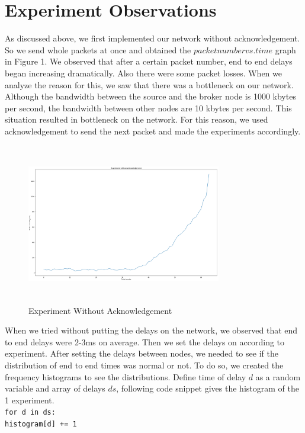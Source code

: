 \documentclass[conference]{IEEEtran}
\begin{document}
\section{Experiment Observations}
As discussed above, we first implemented our network without acknowledgement. So we send whole packets at once and obtained the $packet number vs. time$ graph in Figure 1. We observed that after a certain packet number, end to end delays began increasing dramatically. Also there were some packet losses. When we analyze the reason for this, we saw that there was a bottleneck on our network. Although the bandwidth between the source and the broker node is 1000 kbytes per second, the bandwidth between other nodes are 10 kbytes per second. This situation resulted in bottleneck on the network. For this reason, we used acknowledgement to send the next packet and made the experiments accordingly. \\

\begin{figure}[t]
\includegraphics[width=8.5cm, height=7cm]{without_ack.png}
 \caption{Experiment Without Acknowledgement}
 \label{fig:1}
\end{figure}

When we tried without putting the delays on the network, we observed that end to end delays were 2-3ms on average. Then we set the delays on according to experiment. After setting the delays between nodes, we needed to see if the distribution of end to end times was normal or not. To do so, we created the frequency histograms to see the distributions. Define time of delay $d$ as a random variable and array of delays $ds$, following code snippet gives the histogram of the 1 experiment.\\
\texttt{for d in ds:} \\
\indent\texttt{histogram[d] += 1} \\
\end{document}
